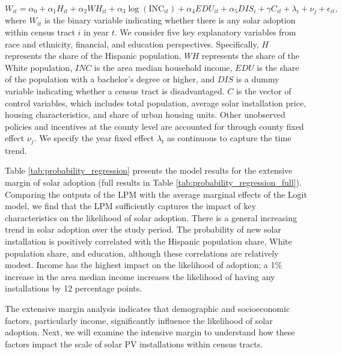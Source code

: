\documentclass[11pt,twoside,letterpaper]{article}
\begin{document}
\begin{equation}\label{reg_1}
W_{it}= \alpha_{0} + \alpha_{1}H_{it} + \alpha_{2}WH_{it} + \alpha_{3}\log(\text{INC}_{it}) + \alpha_{4}EDU_{it} + \alpha_{5}DIS_{i} +\gamma C_{it} + \lambda_{t} + \nu_{j} + \epsilon_{it},
\end{equation}
where $W_{it}$ is the binary variable indicating whether there is any solar adoption within census tract $i$ in year $t$. We consider five key explanatory variables from race and ethnicity, financial, and education perspectives. Specifically, $H$ represents the share of the Hispanic population, $WH$ represents the share of the White population, $INC$ is the area median household income, $EDU$ is the share of the population with a bachelor's degree or higher, and $DIS$ is a dummy variable indicating whether a census tract is disadvantaged. $C$ is the vector of control variables, which includes total population, average solar installation price, housing characteristics, and share of urban housing units. Other unobserved policies and incentives at the county level are accounted for through county fixed effect $\nu_j$. We specify the year fixed effect $\lambda_t$ as continuous to capture the time trend.


Table \ref{tab:probability_regression} presents the model results for the extensive margin of solar adoption (full results in Table \ref{tab:probability_regression_full}). Comparing the outputs of the LPM with the average marginal effects of the Logit model, we find that the LPM sufficiently captures the impact of key characteristics on the likelihood of solar adoption. There is a general increasing trend in solar adoption over the study period. The probability of new solar installation is positively correlated with the Hispanic population share, White population share, and education, although these correlations are relatively modest. Income has the highest impact on the likelihood of adoption; a 1\% increase in the area median income increases the likelihood of having any installations by 12 percentage points. 

The extensive margin analysis indicates that demographic and socioeconomic factors, particularly income, significantly influence the likelihood of solar adoption. Next, we will examine the intensive margin to understand how these factors impact the scale of solar PV installations within census tracts.
\end{document}
